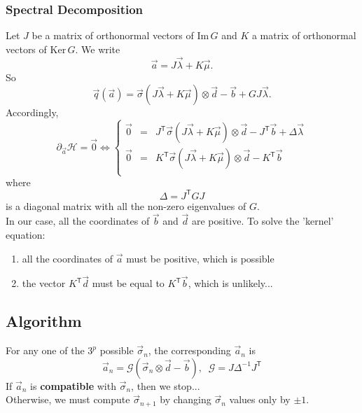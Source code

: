 \documentclass{revtex4}
\newcommand{\trn}[1]{{#1}^{\mathsf{T}}}
\begin{document}
\subsubsection{Spectral Decomposition}
Let ${J}$ be a matrix of orthonormal vectors of $\mathrm{Im}\,G$ and ${K}$ a matrix of orthonormal vectors of $\mathrm{Ker}\,G$.
We write
\begin{equation}
	\vec{a} =  {J} \vec{\lambda} +  {K} \vec{\mu}.
\end{equation}
So
\begin{equation}
	\vec{q}\left(\vec{a}\right) = \vec{\sigma}\left({J} \vec{\lambda} +  {K} \vec{\mu}\right) \otimes \vec{d} -\vec{b} + G J \vec{\lambda}.
\end{equation}
Accordingly,
\begin{equation}
\partial_{\vec{a}}\mathcal{H} = \vec{0} \Leftrightarrow
\left\lbrace
	\begin{array}{rcl}
	\vec{0} & = & \trn{J} \vec{\sigma}\left({J} \vec{\lambda} +  {K} \vec{\mu}\right) \otimes \vec{d} - \trn{J}\vec{b} + \Delta \vec{\lambda}\\
	\vec{0} & = & \trn{K} \vec{\sigma}\left({J} \vec{\lambda} +  {K} \vec{\mu}\right) \otimes \vec{d} - \trn{K}\vec{b} \\
	\end{array}
	\right.
\end{equation}
where
\begin{equation}
	\Delta = \trn{J} G J
\end{equation}
is a diagonal matrix with all the non-zero eigenvalues of $G$.\\

In our case, all the coordinates of $\vec{b}$ and $\vec{d}$ are positive. 
To solve the 'kernel' equation:
\begin{enumerate}
\item all the coordinates of $\vec{a}$ must be positive, which is possible
\item the vector $\trn{K}\vec{d}$ must be equal to $\trn{K}\vec{b}$, which is unlikely...
\end{enumerate}

\subsection{Algorithm}
For any one of the $3^p$ possible $\vec{\sigma}_{n}$, the corresponding ${\vec{a}_n}$ is
\begin{equation}
	{\vec{a}_n} = \mathcal{G} \left(\vec{\sigma}_n\otimes\vec{d}-\vec{b}\right), \;\;\mathcal{G} = J\Delta^{-1}\trn{J}
\end{equation}
If $\vec{a}_n$ is \textbf{compatible} with $\vec{\sigma}_n$, then we stop...\\
Otherwise, we must compute $\vec{\sigma}_{n+1}$ by changing $\vec{\sigma}_n$ values only by $\pm1$.
\end{document}
